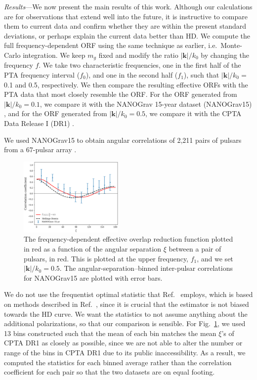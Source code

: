 \documentclass[prd,twocolumn,aps,psfig,nofootinbib,nobibnotes,superscriptaddress,preprintnumbers,times]{revtex4-2}
\begin{document}
\textit{Results}---We now present the main results of this work. Although our calculations are for observations that extend well into the future, it is instructive to compare them to current data and confirm whether they are within the present standard deviations, or perhaps explain the current data better than HD. We compute the full frequency-dependent ORF using the same technique as earlier, i.e.\ Monte-Carlo integration. We keep $m_g$ fixed and modify the ratio $|\boldsymbol{k}|/k_0$ by changing the frequency $f$. We take two characteristic frequencies, one in the first half of the PTA frequency interval ($f_0$), and one in the second half ($f_1$), such that $|\boldsymbol{k}|/k_0 =$ 0.1 and 0.5, respectively. We then compare the resulting effective ORFs with the PTA data that most closely resemble the ORF. For the ORF generated from $|\boldsymbol{k}|/k_0 = 0.1$, we compare it with the NANOGrav 15-year dataset (NANOGrav15) \cite{Agazie:2023}, and for the ORF generated from $|\boldsymbol{k}|/k_0 = 0.5$, we compare it with the CPTA Data Release I (DR1) \cite{Xu:2023wog}.

We used NANOGrav15 to obtain angular correlations of 2,211 pairs of pulsars from a 67-pulsar array \cite{Agazie:2023}. 
\begin{figure}[ht]
    \centering
    \includegraphics[width=0.45\textwidth]{fig2.pdf}
    \caption{The frequency-dependent effective overlap reduction function plotted in red as a function of the angular separation $\xi$ between a pair of pulsars, in red. This is plotted at the upper frequency, $f_1$, and we set $|\boldsymbol{k}|/k_0 = 0.5$. The angular-separation–binned inter-pulsar correlations for NANOGrav15 are plotted with error bars.}
    \label{fig:ng}
\end{figure}
We do not use the frequentist optimal statistic that Ref.~\cite{Agazie:2023} employs, which is based on methods described in Ref.~\cite{Allen:2022ksj}, since it is crucial that the estimator is not biased towards the HD curve. We want the statistics to not assume anything about the additional polarizations, so that our comparison is sensible. For Fig.~\ref{fig:ng}, we used 13 bins constructed such that the mean of each bin matches the mean $\xi$'s of CPTA DR1 as closely as possible, since we are not able to alter the number or range of the bins in CPTA DR1 due to its public inaccessibility. As a result, we computed the statistics for each binned average rather than the correlation coefficient for each pair so that the two datasets are on equal footing. 
\end{document}
